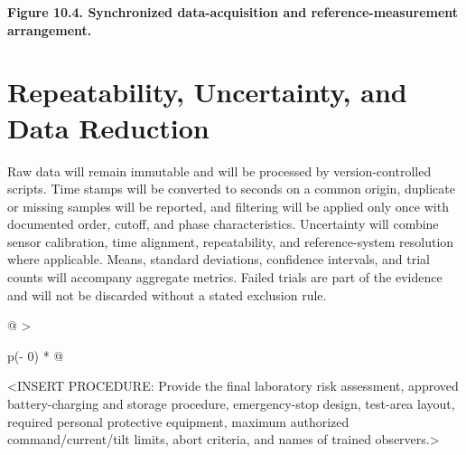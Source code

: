 \begin{center}\singlespacing
{}
\textbf{Figure 10.4. Synchronized data-acquisition and reference-measurement arrangement.}
\end{center}

\section{Repeatability, Uncertainty, and Data Reduction}\label{repeatability-uncertainty-and-data-reduction}

Raw data will remain immutable and will be processed by
version-controlled scripts. Time stamps will be converted to seconds on
a common origin, duplicate or missing samples will be reported, and
filtering will be applied only once with documented order, cutoff, and
phase characteristics. Uncertainty will combine sensor calibration, time
alignment, repeatability, and reference-system resolution where
applicable. Means, standard deviations, confidence intervals, and trial
counts will accompany aggregate metrics. Failed trials are part of the
evidence and will not be discarded without a stated exclusion rule.

\begin{longtable}[]{@{}
  >{\raggedright\arraybackslash}p{(\columnwidth - 0\tabcolsep) * }@{}}
\toprule\noalign{}
\begin{minipage}[b]{\linewidth}\raggedright
\textless INSERT PROCEDURE: Provide the final laboratory risk
assessment, approved battery-charging and storage procedure,
emergency-stop design, test-area layout, required personal protective
equipment, maximum authorized command\slash{}current\slash{}tilt limits, abort
criteria, and names of trained observers.\textgreater{}
\end{minipage} \\
\midrule\noalign{}
\endhead
\bottomrule\noalign{}
\endlastfoot
\end{longtable}
